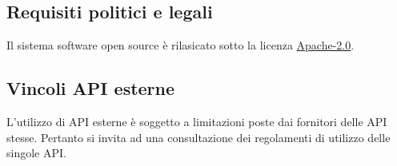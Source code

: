 \documentclass[a4paper,11pt]{article}       %
\begin{document}
    \subsection{Requisiti politici e legali}
        Il sistema software open source è rilasicato sotto la licenza \href{https://github.com/AndreaGrandieri/MagicMirror-GBM/blob/main/LICENSE}{Apache-2.0}.
    
    \subsection{Vincoli API esterne}
        L'utilizzo di API esterne è soggetto a limitazioni poste dai fornitori delle API stesse. Pertanto si invita ad una consultazione dei regolamenti di utilizzo delle singole API.
\clearpage
    \printglossary[nonumberlist]
\end{document}
